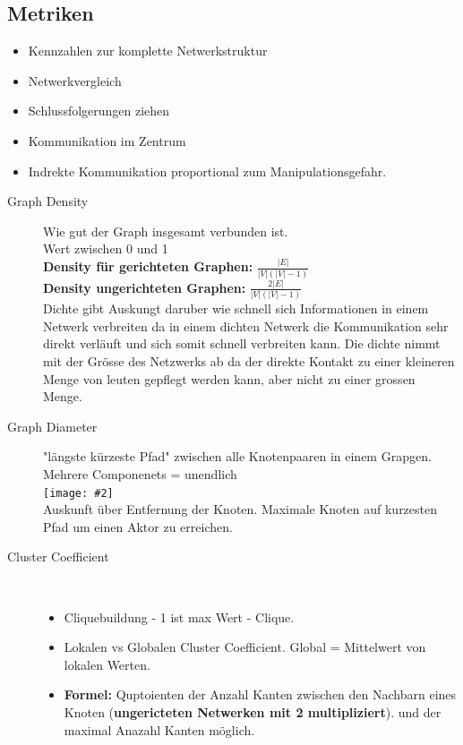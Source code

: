 \documentclass[a4paper,landscape,12pt]{scrreprt}
\newenvironment{Figure}
  {\noindent\minipage{\linewidth}}
  {\endminipage}
\newcommand{\pic}[2][ ]{
\begin{Figure}
 \texttt{[image: \#2]}
 \captionof{figure}{#1}
\end{Figure}
}
\newcommand{\dsp}{
\hfill \\
}
\begin{document}
\begin{multicols*}{2}
\section{Metriken} %
\label{sec:metriken}
\begin{itemize}
	\item Kennzahlen zur komplette Netwerkstruktur
	\item Netwerkvergleich
	\item Schlussfolgerungen ziehen
	\item Kommunikation im Zentrum
	\item Indrekte Kommunikation proportional zum Manipulationsgefahr.
\end{itemize}

\begin{description}
	\item[Graph Density] Wie gut der Graph insgesamt verbunden ist.\\
	Wert zwischen 0 und 1\\
	\textbf{Density für gerichteten Graphen:} $ \frac{|E|}{|V|(|V|-1)}$\\
	\textbf{Density ungerichteten Graphen:} $\frac{2|E|}{|V|(|V|-1)}$\\
	Dichte gibt Auskungt daruber wie schnell sich Informationen in einem Netwerk verbreiten da in einem dichten Netwerk die Kommunikation sehr direkt verläuft und sich somit schnell verbreiten kann. Die dichte nimmt mit der Grösse des Netzwerks ab da der direkte Kontakt zu einer kleineren Menge von leuten gepflegt werden kann, aber nicht zu einer grossen Menge.
	\item[Graph Diameter] "längste kürzeste Pfad" zwischen alle Knotenpaaren in einem Grapgen.\\
	Mehrere Componenets = unendlich \\
	\pic{img/diam.png}\\
	Auskunft über Entfernung der Knoten. Maximale Knoten auf kurzesten Pfad um einen Aktor zu erreichen.
	\item[Cluster Coefficient] \dsp
	\begin{itemize}
		\item Cliquebuildung - 1 ist max Wert - Clique.
		\item Lokalen vs Globalen Cluster Coefficient. Global = Mittelwert von lokalen Werten.
		\item \textbf{Formel:} Quptoienten der Anzahl Kanten zwischen den Nachbarn eines Knoten (\textbf{ungericteten Netwerken mit 2 multipliziert}). und der maximal Anazahl Kanten möglich. \\

\end{itemize}
\end{description}
\end{multicols*}
\end{document}
